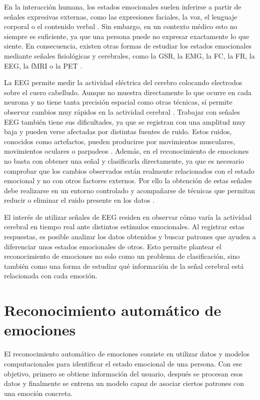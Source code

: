 En la interacción humana, los estados emocionales suelen inferirse a partir de señales expresivas externas, como las expresiones faciales, la voz, el lenguaje corporal o el contenido verbal \cite{keltner2016expression,ekman1971constants,scherer1986vocal}. Sin embargo, en un contexto médico esto no siempre es suficiente, ya que una persona puede no expresar exactamente lo que siente. En consecuencia, existen otras formas de estudiar los estados emocionales mediante señales fisiológicas y cerebrales, como la \ac{GSR}, la \ac{EMG}, la \ac{FC}, la \ac{FR}, la \ac{EEG}, la \ac{fMRI} o la \ac{PET} \cite{alarcao2019eeg}.

La \ac{EEG} permite medir la actividad eléctrica del cerebro colocando electrodos sobre el cuero cabelludo. Aunque no muestra directamente lo que ocurre en cada neurona y no tiene tanta precisión espacial como otras técnicas, sí permite observar cambios muy rápidos en la actividad cerebral \cite{alarcao2019eeg}. Trabajar con señales \ac{EEG} también tiene sus dificultades, ya que se registran con una amplitud muy baja y pueden verse afectadas por distintas fuentes de ruido. Estos ruidos, conocidos como artefactos, pueden producirse por movimientos musculares, movimientos oculares o parpadeos \cite{uriguen2015artifact}. Además, en el reconocimiento de emociones no basta con obtener una señal y clasificarla directamente, ya que es necesario comprobar que los cambios observados están realmente relacionados con el estado emocional y no con otros factores externos. Por ello la obtención de estas señales debe realizarse en un entorno controlado y acompañarse de técnicas que permitan reducir o eliminar el ruido presente en los datos \cite{alarcao2019eeg}.

El interés de utilizar señales de \ac{EEG} residen en observar cómo varía la actividad cerebral en tiempo real ante distintos estímulos emocionales. Al registrar estas respuestas, es posible analizar los datos obtenidos y buscar patrones que ayuden a diferenciar unos estados emocionales de otros. Esto permite plantear el reconocimiento de emociones no solo como un problema de clasificación, sino también como una forma de estudiar qué información de la señal cerebral está relacionada con cada emoción.


\section{Reconocimiento automático de emociones}

El reconocimiento automático de emociones consiste en utilizar datos y modelos computacionales para identificar el estado emocional de una persona. Con ese objetivo, primero se obtiene información del usuario, después se procesan esos datos y finalmente se entrena un modelo capaz de asociar ciertos patrones con una emoción concreta. 


